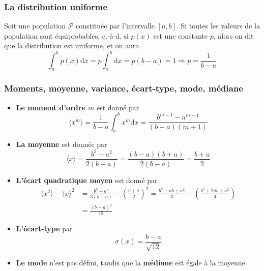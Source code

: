 \documentclass[main.tex]{subfiles}
\begin{document}
\subsubsection{La distribution uniforme}

Soit une population $\mathcal{P}$ constituée par l'intervalle $[a,b]$. Si toutes les valeurs de la population sont équiprobables, c.-à-d. si $p(x)$ est une constante $p$, alors on dit que la distribution est uniforme, et on aura
\begin{equation}
    \int_a^b p(x)\text{d}x=p\int_a^b\text{d}x=p(b-a)=1\Longrightarrow p=\frac{1}{b-a}
\end{equation}

\subsubsection{Moments, moyenne, variance, écart-type, mode, médiane}

\begin{itemize}
    \item \textbf{Le moment d'ordre $m$} est donné par
          \begin{equation}
              \langle x^m\rangle=\frac{1}{b-a}\int_a^b x^m\text{d}x=
              \frac{b^{m+1}-a^{m+1}}{(b-a)(m+1)}
          \end{equation}
    \item \textbf{La moyenne} est donnée par
          \begin{equation}
              \langle x\rangle=\frac{b^2-a^2}{2(b-a)}=\frac{(b-a)(b+a)}{2(b-a)}=\frac{b+a}{2}
          \end{equation}
    \item \textbf{L'écart quadratique moyen} est donné par
          \begin{align}
              \langle x^2\rangle-\langle x\rangle^2 & =\frac{b^3-a^3}{3(b-a)}-\left(\frac{b+a}{2}\right)^2=\frac{b^2+ab+a^2}{3}-\left(\frac{b^2+2ab+a^2}{4}\right)\nonumber \\
                                                    & =\frac{(b-a)^2}{12}
          \end{align}
    \item \textbf{L'écart-type} par
          \begin{equation}
              \sigma(x)=\frac{b-a}{\sqrt{12}}
          \end{equation}
    \item \textbf{Le mode} n'est pas défini, tandis que la \textbf{médiane} est égale à la moyenne.
\end{itemize}
\end{document}
